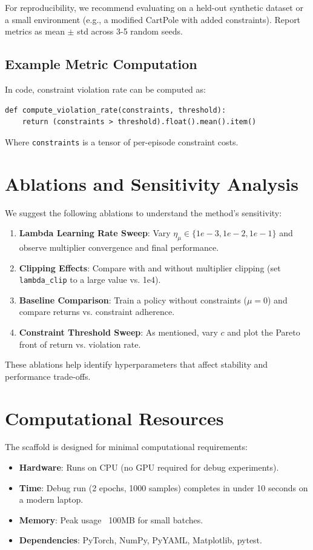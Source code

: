 For reproducibility, we recommend evaluating on a held-out synthetic dataset or a small environment (e.g., a modified CartPole with added constraints). Report metrics as mean $\pm$ std across 3-5 random seeds.

\subsection{Example Metric Computation}
In code, constraint violation rate can be computed as:
\begin{verbatim}
def compute_violation_rate(constraints, threshold):
    return (constraints > threshold).float().mean().item()
\end{verbatim}
Where \texttt{constraints} is a tensor of per-episode constraint costs.

\section{Ablations and Sensitivity Analysis}
\label{sec:ablations}

We suggest the following ablations to understand the method's sensitivity:

\begin{enumerate}
  \item \textbf{Lambda Learning Rate Sweep}: Vary $\eta_\mu \in \{1e-3, 1e-2, 1e-1\}$ and observe multiplier convergence and final performance.
  \item \textbf{Clipping Effects}: Compare with and without multiplier clipping (set \texttt{lambda\_clip} to a large value vs. 1e4).
  \item \textbf{Baseline Comparison}: Train a policy without constraints ($\mu=0$) and compare returns vs. constraint adherence.
  \item \textbf{Constraint Threshold Sweep}: As mentioned, vary $c$ and plot the Pareto front of return vs. violation rate.
\end{enumerate}

These ablations help identify hyperparameters that affect stability and performance trade-offs.

\section{Computational Resources}
\label{sec:resources}

The scaffold is designed for minimal computational requirements:

\begin{itemize}
  \item \textbf{Hardware}: Runs on CPU (no GPU required for debug experiments).
  \item \textbf{Time}: Debug run (2 epochs, 1000 samples) completes in under 10 seconds on a modern laptop.
  \item \textbf{Memory}: Peak usage ~100MB for small batches.
  \item \textbf{Dependencies}: PyTorch, NumPy, PyYAML, Matplotlib, pytest.
\end{itemize}

